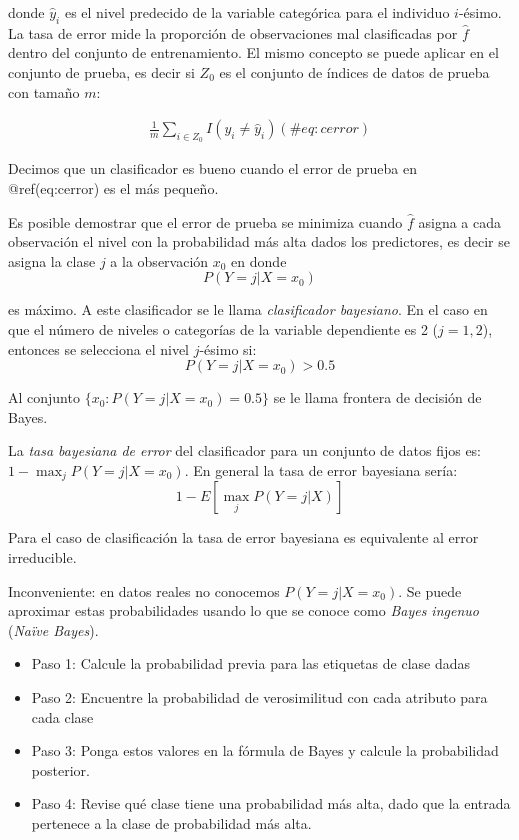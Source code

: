 \documentclass[
  12pt,
]{book}
\providecommand{\tightlist}{%
  \setlength{\itemsep}{0pt}\setlength{\parskip}{0pt}}
\begin{document}
donde \(\hat y_i\) es el nivel predecido de la variable categórica para
el individuo \(i\)-ésimo. La tasa de error mide la proporción de
observaciones mal clasificadas por \(\hat f\) dentro del conjunto de
entrenamiento. El mismo concepto se puede aplicar en el conjunto de
prueba, es decir si \(Z_0\) es el conjunto de índices de datos de prueba
con tamaño \(m\):

\begin{align}
\frac 1 m \sum_{i \in Z_0}I(y_i\neq \hat y_i)
(\#eq:cerror)
\end{align}

Decimos que un clasificador es bueno cuando el error de prueba en
@ref(eq:cerror) es el más pequeño.

Es posible demostrar que el error de prueba se minimiza cuando
\(\hat f\) asigna a cada observación el nivel con la probabilidad más
alta dados los predictores, es decir se asigna la clase \(j\) a la
observación \(x_0\) en donde \[P(Y=j|X=x_0)\]

es máximo. A este clasificador se le llama \emph{clasificador
bayesiano}. En el caso en que el número de niveles o categorías de la
variable dependiente es 2 (\(j=1,2\)), entonces se selecciona el nivel
\(j\)-ésimo si: \[P(Y=j|X=x_0)>0.5\]

Al conjunto \(\{x_0: P(Y=j|X=x_0)=0.5\}\) se le llama frontera de
decisión de Bayes.

La \emph{tasa bayesiana de error} del clasificador para un conjunto de
datos fijos es: \(1-\max_j P(Y=j|X=x_0)\). En general la tasa de error
bayesiana sería: \[1-E\left[\max_j P(Y=j|X)\right]\]

Para el caso de clasificación la tasa de error bayesiana es equivalente
al error irreducible.

Inconveniente: en datos reales no conocemos \(P(Y=j|X=x_0)\). Se puede
aproximar estas probabilidades usando lo que se conoce como \emph{Bayes
ingenuo} (\emph{Naïve Bayes}).

\begin{itemize}
\tightlist
\item
  Paso 1: Calcule la probabilidad previa para las etiquetas de clase
  dadas
\item
  Paso 2: Encuentre la probabilidad de verosimilitud con cada atributo
  para cada clase
\item
  Paso 3: Ponga estos valores en la fórmula de Bayes y calcule la
  probabilidad posterior.
\item
  Paso 4: Revise qué clase tiene una probabilidad más alta, dado que la
  entrada pertenece a la clase de probabilidad más alta.
\end{itemize}
\end{document}
